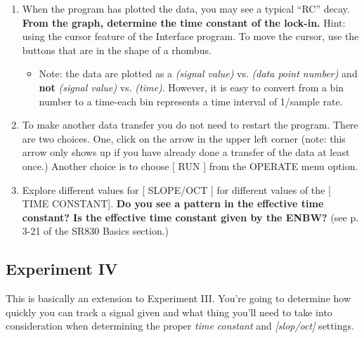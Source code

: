 \documentclass{../lab}
\begin{document}
\begin{enumerate}
    \item When the program has plotted the data, you may see a typical ``RC'' decay. \textbf{From the graph, determine the time constant of the lock-in.} Hint: using the cursor feature of the Interface program. To move the cursor, use the buttons that are in the shape of a rhombus.
    \begin{itemize}
        \item Note: the data are plotted as a \emph{(signal value)} vs. \emph{(data point number)} and \textbf{not} \emph{(signal value) }vs. \emph{(time)}. However, it is easy to convert from a bin number to a time-each bin represents a time interval of 1/sample rate.
    \end{itemize}

    \item To make another data transfer you do not need to restart the program. There are two choices. One, click on the arrow in the upper left corner (note: this arrow only shows up if you have already done a transfer of the data at least once.) Another choice is to choose [ RUN ] from the OPERATE menu option.

    \item Explore different values for [ SLOPE/OCT ] for different values of the [ TIME CONSTANT]. \textbf{Do you see a pattern in the effective time constant? Is the effective time constant given by the ENBW?} (see p. 3-21 of the SR830 Basics section.)

\end{enumerate}

\subsection{Experiment IV}

This is basically an extension to Experiment III. You're going to determine how quickly you can track a signal given and what thing you'll need to take into consideration when determining the proper \emph{time constant} and \emph{[slop/oct] }settings.
\end{document}
